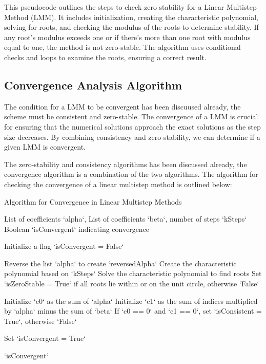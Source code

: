 \documentclass[a4paper, twoside]{report} %
\begin{document}
	\newpage
	This pseudocode outlines the steps to check zero stability for a Linear Multistep Method (LMM). It includes initialization, creating the characteristic polynomial, solving for roots, and checking the modulus of the roots to determine stability. If any root's modulus exceeds one or if there's more than one root with modulus equal to one, the method is not zero-stable. The algorithm uses conditional checks and loops to examine the roots, ensuring a correct result.

	\subsection{Convergence Analysis Algorithm}
	The condition for a LMM to be convergent has been discuused already, the scheme must be consistent and zero-stable. The convergence of a LMM is crucial for ensuring that the numerical solutions approach the exact solutions as the step size decreases. By combining consistency and zero-stability, we can determine if a given LMM is convergent.

	The zero-stability and consistency algorithms has been discussed already, the convergence algorithm is a combination of the two algorithms. The algorithm for checking the convergence of a linear multistep method is outlined below:

	\begin{algorithm}
		\caption{Algorithm for Convergence in Linear Multistep Methods}
		\label{alg:convergence}

		\begin{algorithmic}[1] %

			\REQUIRE List of coefficients `alpha`, List of coefficients `beta`, number of steps `kSteps`
			\ENSURE Boolean `isConvergent` indicating convergence

			\STATE Initialize a flag `isConvergent = False`

			\STATE Reverse the list `alpha` to create `reversedAlpha`
			\STATE Create the characteristic polynomial based on `kSteps`
			\STATE Solve the characteristic polynomial to find roots
			\STATE Set `isZeroStable = True` if all roots lie within or on the unit circle, otherwise `False`

			\STATE Initialize `c0` as the sum of `alpha`
			\STATE Initialize `c1` as the sum of indices multiplied by `alpha` minus the sum of `beta`
			\STATE If `c0 == 0` and `c1 == 0`, set `isConsistent = True`, otherwise `False`

			\STATE Set `isConvergent = True`
			\ENDIF

			\RETURN `isConvergent`

		\end{algorithmic}
	\end{algorithm}
\end{document}
